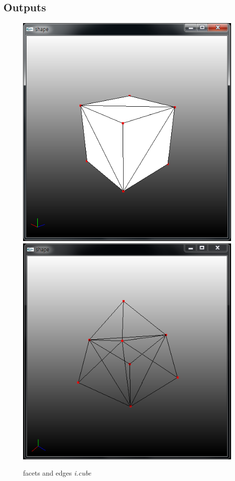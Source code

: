 \documentclass[11pt]{article}
\begin{document}
\subsection{Outputs}
\begin{figure}[h]
\includegraphics[width=.5\textwidth]{FIGS/icube-faces}
\hspace{1cm}
\includegraphics[width=.5\textwidth]{FIGS/icube-edges}

\caption{facets and edges \textit{i.cube}}
\end{figure}
\end{document}
